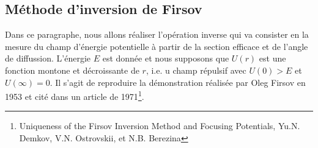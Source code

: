 \subsection{M\'ethode d'inversion de Firsov}

Dans ce paragraphe, nous allons r\'ealiser l'op\'eration inverse qui va consister en la mesure du champ d'\'energie potentielle \`a partir de la section efficace et de l'angle de diffussion. L'\'energie $E$ est donn\'ee et nous supposons que $U(r)$ est une fonction montone et d\'ecroissante de $r$, i.e. u champ r\'epulsif avec $U(0) > E$ et $U(\infty) = 0$. Il s'agit de reproduire la d\'emonstration r\'ealis\'ee par Oleg Firsov en 1953 et cit\'e dans un article de 1971\footnote{Uniqueness of the Firsov Inversion Method and Focusing Potentials, Yu.N. Demkov, V.N. Ostrovskii, et N.B. Berezina}.

